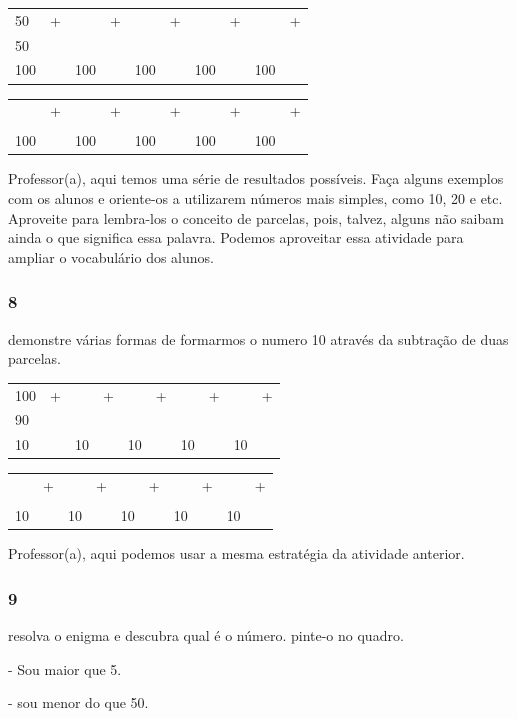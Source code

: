\begin{longtable}[]{@{}llllllllll@{}}
\toprule
50 & + & & + & & + & & + & & +\tabularnewline
50 & & & & & & & & &\tabularnewline
100 & & 100 & & 100 & & 100 & & 100 &\tabularnewline
\bottomrule
\end{longtable}

\begin{longtable}[]{@{}llllllllll@{}}
\toprule
& + & & + & & + & & + & & +\tabularnewline
& & & & & & & & &\tabularnewline
100 & & 100 & & 100 & & 100 & & 100 &\tabularnewline
\bottomrule
\end{longtable}

Professor(a), aqui temos uma série de resultados possíveis. Faça alguns
exemplos com os alunos e oriente-os a utilizarem números mais simples,
como 10, 20 e etc. Aproveite para lembra-los o conceito de parcelas,
pois, talvez, alguns não saibam ainda o que significa essa palavra.
Podemos aproveitar essa atividade para ampliar o vocabulário dos alunos.

\subsubsection{8}\label{section-15}

demonstre várias formas de formarmos o numero 10 através da subtração de
duas parcelas.

\begin{longtable}[]{@{}llllllllll@{}}
\toprule
100 & + & & + & & + & & + & & +\tabularnewline
90 & & & & & & & & &\tabularnewline
10 & & 10 & & 10 & & 10 & & 10 &\tabularnewline
\bottomrule
\end{longtable}

\begin{longtable}[]{@{}llllllllll@{}}
\toprule
& + & & + & & + & & + & & +\tabularnewline
& & & & & & & & &\tabularnewline
10 & & 10 & & 10 & & 10 & & 10 &\tabularnewline
\bottomrule
\end{longtable}

Professor(a), aqui podemos usar a mesma estratégia da atividade
anterior.

\subsubsection{9}\label{section-16}

resolva o enigma e descubra qual é o número. pinte-o no quadro.

- Sou maior que 5.

- sou menor do que 50.

